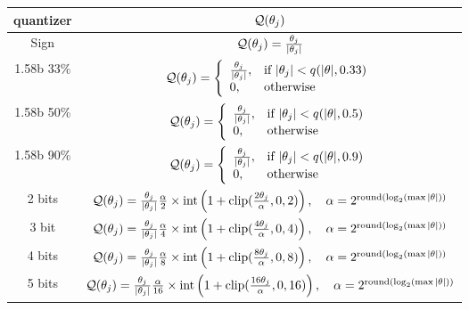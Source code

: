 \begin{tabular}{c|c}
{quantizer} & {${\mathcal{Q}}(\theta_j)$} \\
\midrule
Sign &  ${\mathcal{Q}}(\theta_j) = \frac{\theta_j}{|\theta_j|}$\\
\midrule
1.58b 33\% & ${\mathcal{Q}}(\theta_j) = \left\{
   \begin{array}{ll}
        \frac{\theta_j}{|\theta_j|},& \text{if }|\theta_j| < q(|\theta|, 0.33)\\
       0, & \text{otherwise}
   \end{array}
   \right.$\\
\midrule
1.58b 50\%  & ${\mathcal{Q}}(\theta_j) = \left\{
   \begin{array}{ll}
        \frac{\theta_j}{|\theta_j|},& \text{if }|\theta_j| < q(|\theta|, 0.5)\\
       0, & \text{otherwise}
   \end{array}
   \right.$\\
\midrule
1.58b 90\%  & ${\mathcal{Q}}(\theta_j) = \left\{
   \begin{array}{ll}
        \frac{\theta_j}{|\theta_j|},& \text{if }|\theta_j| < q(|\theta|, 0.9)\\
       0, & \text{otherwise}
   \end{array}
   \right.$\\
\midrule
2 bits & ${\mathcal{Q}}(\theta_j) =\frac{\theta_j}{|\theta_j|} \frac{\alpha}{2} \times \text{int}\left(1+ \text{clip}(\frac{2\theta_j}{\alpha}, 0, 2)\right), \quad \alpha = 2^{\text{round}(\log_2\left(\max |\theta|\right))}$\\
\midrule
3 bit & ${\mathcal{Q}}(\theta_j) =\frac{\theta_j}{|\theta_j|} \frac{\alpha}{4} \times \text{int}\left(1+ \text{clip}(\frac{4\theta_j}{\alpha}, 0, 4)\right), \quad \alpha = 2^{\text{round}(\log_2\left(\max |\theta|\right))}$\\
\midrule
4 bits & ${\mathcal{Q}}(\theta_j) =\frac{\theta_j}{|\theta_j|} \frac{\alpha}{8} \times \text{int}\left(1+ \text{clip}(\frac{8\theta_j}{\alpha}, 0, 8)\right), \quad \alpha = 2^{\text{round}(\log_2\left(\max |\theta|\right))}$\\
\midrule
5 bits & ${\mathcal{Q}}(\theta_j) =\frac{\theta_j}{|\theta_j|} \frac{\alpha}{16} \times \text{int}\left(1+ \text{clip}(\frac{16\theta_j}{\alpha}, 0, 16)\right), \quad \alpha = 2^{\text{round}(\log_2\left(\max |\theta|\right))}$\\
\bottomrule
\end{tabular}
